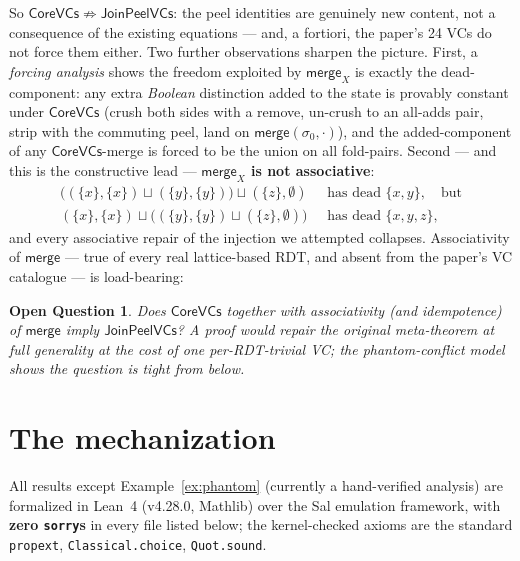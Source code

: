 \documentclass[11pt]{article}
\newtheorem{openq}[theorem]{Open Question}
\newcommand{\Merge}{\mathsf{merge}}
\newcommand{\Sinit}{\sigma_0}
\newcommand{\co}{\mathsf{CoreVCs}}
\newcommand{\jp}{\mathsf{JoinPeelVCs}}
\newcommand{\lean}[1]{\texttt{#1}}
\begin{document}
So $\co \not\Rightarrow \jp$: the peel identities are genuinely new
content, not a consequence of the existing equations --- and, a fortiori,
the paper's 24 VCs do not force them either. Two further observations
sharpen the picture. First, a \emph{forcing analysis} shows the freedom
exploited by $\Merge_X$ is exactly the dead-component: any extra
\emph{Boolean} distinction added to the state is provably constant under
$\co$ (crush both sides with a remove, un-crush to an all-adds pair,
strip with the commuting peel, land on $\Merge(\Sinit,\cdot)$), and the
added-component of any $\co$-merge is forced to be the union on all
fold-pairs. Second --- and this is the constructive lead ---
\textbf{$\Merge_X$ is not associative}:
\begin{align*}
\bigl((\{x\},\{x\}) \sqcup (\{y\},\{y\})\bigr) \sqcup (\{z\},\emptyset)
&\;\text{ has dead } \{x,y\}, \quad\text{but}\\
(\{x\},\{x\}) \sqcup \bigl((\{y\},\{y\}) \sqcup (\{z\},\emptyset)\bigr)
&\;\text{ has dead } \{x,y,z\},
\end{align*}
and every associative repair of the injection we attempted collapses.
Associativity of $\Merge$ --- true of every real lattice-based RDT, and
absent from the paper's VC catalogue --- is load-bearing:

\begin{openq}
Does $\co$ together with associativity (and idempotence) of $\Merge$
imply $\jp$? A proof would repair the original meta-theorem at full
generality at the cost of one per-RDT-trivial VC; the phantom-conflict
model shows the question is tight from below.
\end{openq}

\section{The mechanization}
\label{sec:mech}

All results except Example~\ref{ex:phantom} (currently a hand-verified
analysis) are formalized in Lean~4 (v4.28.0, Mathlib) over the Sal
emulation framework, with \textbf{zero \lean{sorry}s} in every file
listed below; the kernel-checked axioms are the standard
\lean{propext}, \lean{Classical.choice}, \lean{Quot.sound}.
\end{document}
